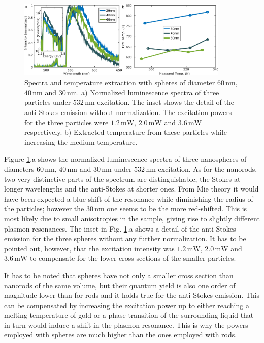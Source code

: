 \documentclass[journal=nalefd,manuscript=letter]{achemso}
\newcommand{\nm}{\ensuremath{\,\textrm{nm}}}
\newcommand{\mW}{\ensuremath{\,\textrm{mW}}}
\begin{document}
\begin{figure}[htp] \centering
\includegraphics[width=0.90\textwidth]{Figures/07_Spheres/07_spheres.png}
\caption{Spectra and temperature extraction with spheres of
diameter $60\nm$,$40\nm$ and $30\nm$. a) Normalized luminescence spectra of
three particles under $532\nm$ excitation. The inset shows the detail of the
anti-Stokes emission without normalization. The excitation powers for the three
particles were $1.2\mW$, $2.0\mW$ and $3.6\mW$ respectively. b) Extracted
temperature from these particles while increasing the medium temperature.}
	\label{fig:spheres}
\end{figure}

Figure \ref{fig:spheres}.a shows the normalized luminescence spectra of three
nanospheres of diameters $60\nm$, $40\nm$ and $30\nm$ under $532\nm$ excitation.
As for the nanorods, two very distinctive parts of the spectrum are
distinguishable, the Stokes at longer wavelengths and the anti-Stokes at shorter
ones. From Mie theory it would have been expected a blue shift of the resonance
while diminishing the radius of the particles; however the $30\nm$ one seems to
be the more red-shifted. This is most likely due to small anisotropies in the
sample, giving rise to slightly different plasmon resonances. The inset in Fig.
\ref{fig:spheres}.a shows a detail of the anti-Stokes emission for the three
spheres without any further normalization. It has to be pointed out, however,
that the excitation intensity was $1.2\mW$, $2.0\mW$ and $3.6\mW$ to compensate
for the lower cross sections of the smaller particles.

It has to be noted that spheres have not only a smaller cross section than
nanorods of the same volume, but their quantum yield is also one order of
magnitude lower than for rods and it holds true for the anti-Stokes emission.
This can be compensated by increasing the excitation power up to either reaching
a melting temperature of gold or a phase transition of the surrounding liquid
that in turn would induce a shift in the plasmon resonance. This is why the
powers employed with spheres are much higher than the ones employed with rods.
\end{document}
